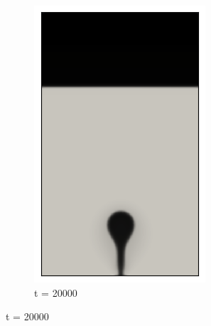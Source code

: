 \begin{figure}[H]
\begin{subfigure}{0.25\textwidth}
		\includegraphics[width=\linewidth]{figs/cap4/bb_760_d20}
		\caption{t = 20000}
		\label{fig:3}
	\end{subfigure}
	

\end{figure}
